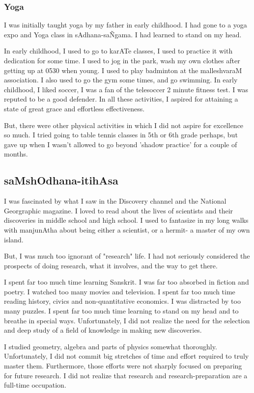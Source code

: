 \documentclass[oneside, article]{memoir}
\begin{document}
\subsubsection{Yoga}
I was initially taught yoga by my father in early childhood. I had gone to a yoga expo and Yoga class in sAdhana-sa\~Ngama. I had learned to stand on my head.

In early childhood, I used to go to karATe classes, I used to practice it with dedication for some time. I used to jog in the park, wash my own clothes after getting up at 0530 when young. I used to play badminton at the malleshvaraM association. I also used to go the gym some times, and go swimming. In early childhood, I liked soccer, I was a fan of the telesoccer 2 minute fitness test. I was reputed to be a good defender. In all these activities, I aspired for attaining a state of great grace and effortless effectiveness.

But, there were other physical activities in which I did not aspire for excellence so much. I tried going to table tennis classes in 5th or 6th grade perhaps, but gave up when I wasn't allowed to go beyond 'shadow practice' for a couple of months.

\subsection{saMshOdhana-itihAsa}
I was fascinated by what I saw in the Discovery channel and the National Georgraphic magazine. I loved to read about the lives of scientists and their discoveries in middle school and high school. I used to fantasize in my long walks with manjunAtha about being either a scientist, or a hermit- a master of my own island.

But, I was much too ignorant of "research" life. I had not seriously considered the prospects of doing research, what it involves, and the way to get there.

I spent far too much time learning Sanskrit. I was far too absorbed in fiction and poetry. I watched too many movies and television. I spent far too much time reading history, civics and non-quantitative economics. I was distracted by too many puzzles. I spent far too much time learning to stand on my head and to breathe in special ways. Unfortunately, I did not realize the need for the selection and deep study of a field of knowledge in making new discoveries.

I studied geometry, algebra and parts of physics somewhat thoroughly. Unfortunately, I did not commit big stretches of time and effort required to truly master them. Furthermore, those efforts were not sharply focused on preparing for future research. I did not realize that research and research-preparation are a full-time occupation.
\end{document}
